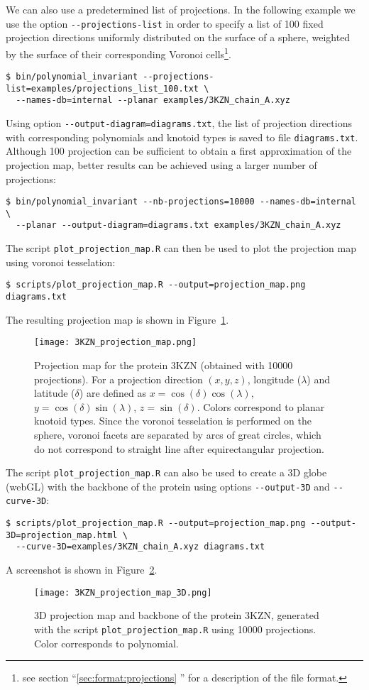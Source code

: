 We can also use a predetermined list of projections. In the following example we use the option \lstinline{--projections-list} in order to specify a list of 100 fixed projection directions uniformly distributed on the surface of a sphere, weighted by the surface of their corresponding Voronoi cells\footnote{see section ``\ref{sec:format:projections} '' for a description of the file format.}. 
\begin{lstlisting}
$ bin/polynomial_invariant --projections-list=examples/projections_list_100.txt \
  --names-db=internal --planar examples/3KZN_chain_A.xyz
\end{lstlisting}

Using option \lstinline{--output-diagram=diagrams.txt}, the list of projection directions with corresponding polynomials and knotoid types is saved to file \lstinline{diagrams.txt}. Although 100 projection can be sufficient to obtain a first approximation of the projection map, better results can be achieved using a larger number of projections:
\begin{lstlisting}
$ bin/polynomial_invariant --nb-projections=10000 --names-db=internal \
  --planar --output-diagram=diagrams.txt examples/3KZN_chain_A.xyz
\end{lstlisting}
The script \lstinline{plot_projection_map.R} can then be used to plot the projection map using voronoi tesselation:
\begin{lstlisting}
$ scripts/plot_projection_map.R --output=projection_map.png diagrams.txt
\end{lstlisting}
The resulting projection map is shown in Figure~\ref{fig:3KZN:projectionmap}.
\begin{figure}[t]
\centering
\texttt{[image: 3KZN\_projection\_map.png]}
\caption{Projection map for the protein 3KZN (obtained with 10000 projections).  For a projection direction $(x,y,z)$, longitude ($\lambda$) and latitude ($\delta$) are defined as $x=\cos(\delta)\cos(\lambda)$, $y=\cos(\delta)\sin(\lambda)$, $z=\sin(\delta)$. Colors correspond to planar knotoid types. Since the voronoi tesselation is performed on the sphere, voronoi facets are separated by arcs of great circles, which do not correspond to straight line after equirectangular projection.}\label{fig:3KZN:projectionmap}
\end{figure}
The script \lstinline{plot_projection_map.R} can also be used to create a 3D globe (webGL) with the backbone of the protein using options \lstinline{--output-3D} and \lstinline{--curve-3D}:
\begin{lstlisting}
$ scripts/plot_projection_map.R --output=projection_map.png --output-3D=projection_map.html \
  --curve-3D=examples/3KZN_chain_A.xyz diagrams.txt
\end{lstlisting}
A screenshot is shown in Figure~\ref{fig:3KZN:projectionmap:3D}.
\begin{figure}[t]
\centering
\texttt{[image: 3KZN\_projection\_map\_3D.png]}
\caption{3D projection map and backbone of the protein 3KZN, generated with the script \lstinline{plot_projection_map.R} using 10000 projections. Color corresponds to polynomial.}\label{fig:3KZN:projectionmap:3D}
\end{figure}


